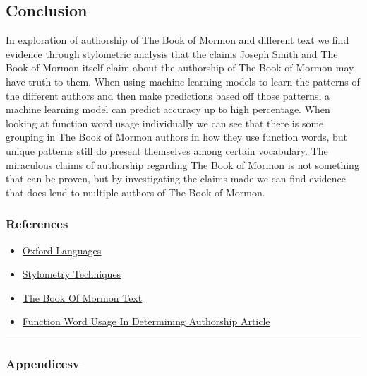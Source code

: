 \documentclass[
  letterpaper,
  DIV=11,
  numbers=noendperiod]{scrartcl}
\providecommand{\tightlist}{%
  \setlength{\itemsep}{0pt}\setlength{\parskip}{0pt}}\usepackage{longtable,booktabs,array}
\begin{document}
\hypertarget{conclusion}{%
\subsection{Conclusion}\label{conclusion}}

In exploration of authorship of The Book of Mormon and different text we
find evidence through stylometric analysis that the claims Joseph Smith
and The Book of Mormon itself claim about the authorship of The Book of
Mormon may have truth to them. When using machine learning models to
learn the patterns of the different authors and then make predictions
based off those patterns, a machine learning model can predict accuracy
up to high percentage. When looking at function word usage individually
we can see that there is some grouping in The Book of Mormon authors in
how they use function words, but unique patterns still do present
themselves among certain vocabulary. The miraculous claims of authorship
regarding The Book of Mormon is not something that can be proven, but by
investigating the claims made we can find evidence that does lend to
multiple authors of The Book of Mormon.

\hypertarget{references}{%
\subsubsection{References}\label{references}}

\begin{itemize}
\tightlist
\item
  \href{https://languages.oup.com/google-dictionary-en}{Oxford
  Languages}
\item
  \href{https://guides.temple.edu/stylometryfordh/methods}{Stylometry
  Techniques}
\item
  \href{https://www.churchofjesuschrist.org/study/scriptures/bofm?lang=eng}{The
  Book Of Mormon Text}
\item
  \href{https://aclanthology.org/W14-0908.pdf}{Function Word Usage In
  Determining Authorship Article}
\end{itemize}

\begin{center}\rule{0.5\linewidth}{0.5pt}\end{center}

\hypertarget{appendicesv}{%
\subsubsection{Appendicesv}\label{appendicesv}}
\end{document}

